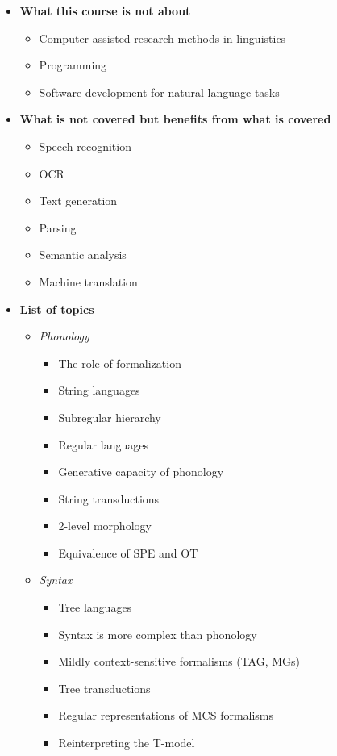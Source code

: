 \begin{itemize}
    \item \textbf{What this course is not about}
        \begin{itemize}
            \item Computer-assisted research methods in linguistics
            \item Programming
            \item Software development for natural language tasks
        \end{itemize}
    \item \textbf{What is not covered but benefits from what is covered}
        \begin{itemize}
            \item Speech recognition
            \item OCR
            \item Text generation
            \item Parsing
            \item Semantic analysis
            \item Machine translation
        \end{itemize}
    \item \textbf{List of topics}
        \begin{itemize}
            \item \emph{Phonology}
                \begin{itemize}
                    \item The role of formalization
                    \item String languages
                    \item Subregular hierarchy
                    \item Regular languages
                    \item Generative capacity of phonology
                    \item String transductions
                    \item 2-level morphology
                    \item Equivalence of SPE and OT
                \end{itemize}
            \item \emph{Syntax}
                \begin{itemize}
                    \item Tree languages
                    \item Syntax is more complex than phonology
                    \item Mildly context-sensitive formalisms (TAG, MGs)
                    \item Tree transductions
                    \item Regular representations of MCS formalisms
                    \item Reinterpreting the T-model
                \end{itemize}
        \end{itemize}
\end{itemize}

